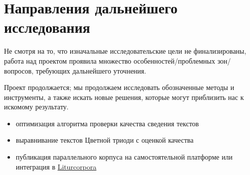 \documentclass[
  letterpaper,
]{book}
\providecommand{\tightlist}{%
  \setlength{\itemsep}{0pt}\setlength{\parskip}{0pt}}\usepackage{longtable,booktabs,array}
\begin{document}

\hypertarget{ux43dux430ux43fux440ux430ux432ux43bux435ux43dux438ux44f-ux434ux430ux43bux44cux43dux435ux439ux448ux435ux433ux43e-ux438ux441ux441ux43bux435ux434ux43eux432ux430ux43dux438ux44f}{%
\chapter{\texorpdfstring{\textbf{Направления дальнейшего
исследования}}{Направления дальнейшего исследования}}\label{ux43dux430ux43fux440ux430ux432ux43bux435ux43dux438ux44f-ux434ux430ux43bux44cux43dux435ux439ux448ux435ux433ux43e-ux438ux441ux441ux43bux435ux434ux43eux432ux430ux43dux438ux44f}}

Не смотря на то, что изначальные исследовательские цели не
финализированы, работа над проектом проявила множество
особенностей/проблемных зон/вопросов, требующих дальнейшего уточнения.

Проект продолжается; мы продолжаем исследовать обозначенные методы и
инструменты, а также искать новые решения, которые могут приблизить нас
к искомому результату.

\begin{itemize}
\tightlist
\item
  оптимизация алгоритма проверки качества сведения текстов
\item
  выравнивание текстов Цветной триоди с оценкой качества
\item
  публикация параллельного корпуса на самостоятельной платформе или
  интеграция в \href{https://liturcorpora.ru/}{Liturcorpora}
\end{itemize}


\backmatter
\end{document}
